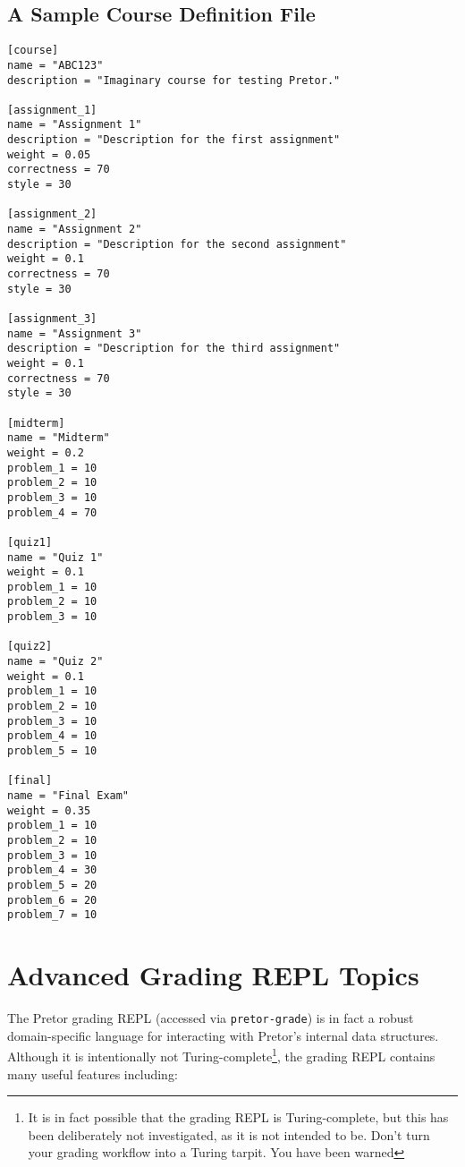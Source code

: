 \documentclass{book}
\begin{document}
\subsection{A Sample Course Definition File}

\begin{verbatim}
[course]
name = "ABC123"
description = "Imaginary course for testing Pretor."

[assignment_1]
name = "Assignment 1"
description = "Description for the first assignment"
weight = 0.05
correctness = 70
style = 30

[assignment_2]
name = "Assignment 2"
description = "Description for the second assignment"
weight = 0.1
correctness = 70
style = 30

[assignment_3]
name = "Assignment 3"
description = "Description for the third assignment"
weight = 0.1
correctness = 70
style = 30

[midterm]
name = "Midterm"
weight = 0.2
problem_1 = 10
problem_2 = 10
problem_3 = 10
problem_4 = 70

[quiz1]
name = "Quiz 1"
weight = 0.1
problem_1 = 10
problem_2 = 10
problem_3 = 10

[quiz2]
name = "Quiz 2"
weight = 0.1
problem_1 = 10
problem_2 = 10
problem_3 = 10
problem_4 = 10
problem_5 = 10

[final]
name = "Final Exam"
weight = 0.35
problem_1 = 10
problem_2 = 10
problem_3 = 10
problem_4 = 30
problem_5 = 20
problem_6 = 20
problem_7 = 10
\end{verbatim}

\section{Advanced Grading REPL Topics}


The Pretor grading REPL (accessed via \texttt{pretor-grade}) is in fact a
robust domain-specific language for interacting with Pretor's internal data
structures. Although it is intentionally not Turing-complete\footnote{It is in
fact possible that the grading REPL is Turing-complete, but this has been
deliberately not investigated, as it is not intended to be. Don't turn your
grading workflow into a Turing tarpit. You have been warned}, the grading
REPL contains many useful features including:
\end{document}
